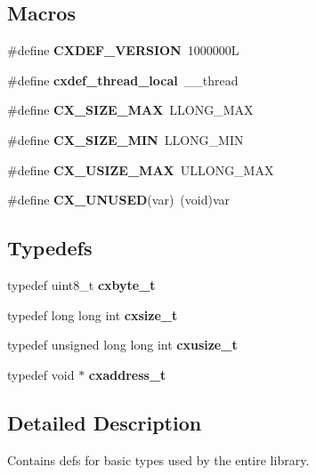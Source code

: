 \subsection*{Macros}
\begin{DoxyCompactItemize}
\item 
\mbox{\label{a00005_a134656a6a11f18770bd91194c04ef3a1}} 
\#define {\bfseries C\+X\+D\+E\+F\+\_\+\+V\+E\+R\+S\+I\+ON}~1000000L
\item 
\mbox{\label{a00005_aa128abea59de98e1afeab8b9cb543faf}} 
\#define {\bfseries cxdef\+\_\+thread\+\_\+local}~\+\_\+\+\_\+thread
\item 
\mbox{\label{a00005_a3a582606c401b0cf2dbe4837a29e4273}} 
\#define {\bfseries C\+X\+\_\+\+S\+I\+Z\+E\+\_\+\+M\+AX}~L\+L\+O\+N\+G\+\_\+\+M\+AX
\item 
\mbox{\label{a00005_af66ce45adb64a8471941d8701601d0b9}} 
\#define {\bfseries C\+X\+\_\+\+S\+I\+Z\+E\+\_\+\+M\+IN}~L\+L\+O\+N\+G\+\_\+\+M\+IN
\item 
\mbox{\label{a00005_a45a19165489f89ff4fd2931364eb38b1}} 
\#define {\bfseries C\+X\+\_\+\+U\+S\+I\+Z\+E\+\_\+\+M\+AX}~U\+L\+L\+O\+N\+G\+\_\+\+M\+AX
\item 
\mbox{\label{a00005_adebd0fc095d60f6cc5fbda71b5b0f25c}} 
\#define {\bfseries C\+X\+\_\+\+U\+N\+U\+S\+ED}(var)~(void)var
\end{DoxyCompactItemize}
\subsection*{Typedefs}
\begin{DoxyCompactItemize}
\item 
\mbox{\label{a00005_a6ad0bec7d93373698ea435d276e790bb}} 
typedef uint8\+\_\+t {\bfseries cxbyte\+\_\+t}
\item 
\mbox{\label{a00005_ae8b3996d7f96d172fe5a5d1239950f04}} 
typedef long long int {\bfseries cxsize\+\_\+t}
\item 
\mbox{\label{a00005_a211a2172fd6b09394b19b1c84b773ace}} 
typedef unsigned long long int {\bfseries cxusize\+\_\+t}
\item 
\mbox{\label{a00005_a4be54d0a0bc96f859aeabbfc5dc9fc27}} 
typedef void $\ast$ {\bfseries cxaddress\+\_\+t}
\end{DoxyCompactItemize}


\subsection{Detailed Description}
Contains defs for basic types used by the entire library. 

